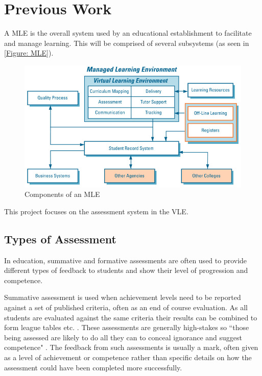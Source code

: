 \newif\ifnote
\notefalse

\chapter{Previous Work} 
\label{Chapter:Previous Work}

A \gls{MLE} is the overall system used by an educational establishment to facilitate and manage learning. This will be comprised of several subsystems (as seen in \autoref{Figure: MLE}).

\begin{figure}[h]
	\centering 
		\includegraphics[scale=0.4]{../figures/MLE.png} 		
	\caption{\label{Figure: MLE} Components of an \gls{MLE} \citep{mle}} 	
\end{figure}

This project focuses on the assessment system in the \gls{VLE}.

\section{Types of Assessment}
\label{Section: Types of Assessment}

In education, summative and formative assessments are often used to provide different types of feedback to students and show their level of progression and competence.

Summative assessment is used when achievement levels need to be reported against a set of published criteria, often as an end of course evaluation. As all students are evaluated against the same criteria their results can be combined to form league tables etc. \citep{assessmentTypes}. These assessments are generally high-stakes so ``those being assessed are likely to do all they can to conceal ignorance and suggest competence" \citep{knight2001briefing}. The feedback from such assessments is usually a mark, often given as a level of achievement or competence rather than specific details on how the assessment could have been completed more successfully.

